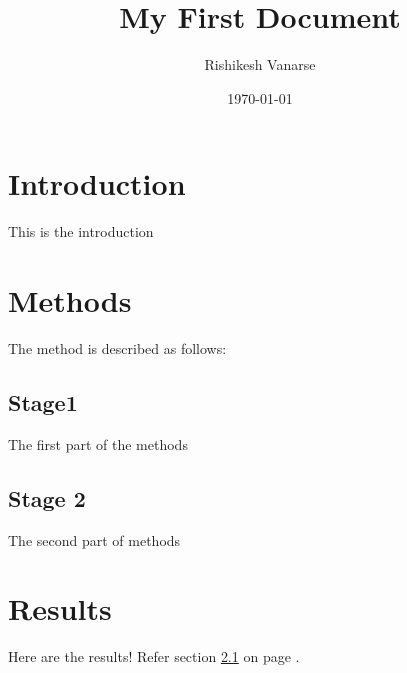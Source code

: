 \documentclass[a4paper, 12pt]{article}
\begin{document}
\title{My First Document}
\author{Rishikesh Vanarse}
\date{\today}
\maketitle

\section{Introduction}
This is the introduction

\section{Methods}
The method is described as follows:

\subsection{Stage1}
\label{sec1}
The first part of the methods

\subsection{Stage 2}
The second part of methods

\section{Results}
Here are the results! Refer section \ref{sec1} on page \pageref{sec1}.
\end{document}

